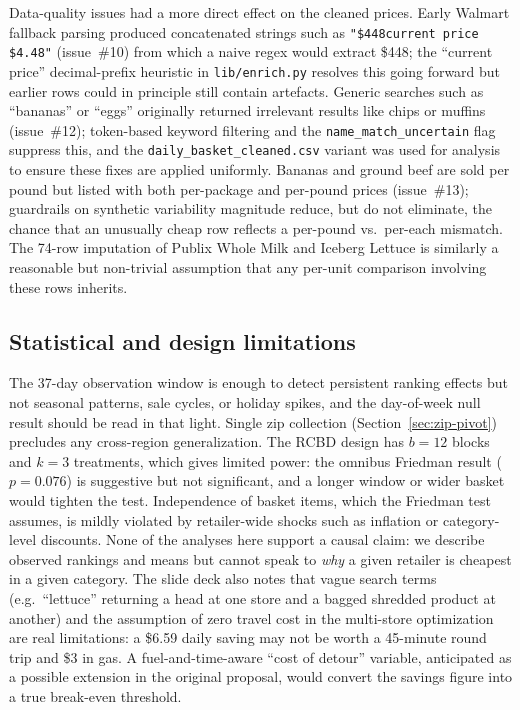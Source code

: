 \documentclass[11pt]{article}
\begin{document}
Data-quality issues had a more direct effect on the cleaned prices.
Early Walmart fallback parsing produced concatenated strings such as
\texttt{"\$448current price \$4.48"} (issue~\#10) from which a naive
regex would extract \$448; the ``current price'' decimal-prefix
heuristic in \texttt{lib/enrich.py} resolves this going forward but
earlier rows could in principle still contain artefacts. Generic
searches such as ``bananas'' or ``eggs'' originally returned
irrelevant results like chips or muffins (issue~\#12); token-based
keyword filtering and the \texttt{name\_match\_uncertain} flag
suppress this, and the \texttt{daily\_basket\_cleaned.csv} variant
was used for analysis to ensure these fixes are applied uniformly.
Bananas and ground beef are sold per pound but listed with both
per-package and per-pound prices (issue~\#13); guardrails on
synthetic variability magnitude reduce, but do not eliminate, the
chance that an unusually cheap row reflects a per-pound vs.\ per-each
mismatch. The 74-row imputation of Publix Whole Milk and Iceberg
Lettuce is similarly a reasonable but non-trivial assumption that any
per-unit comparison involving these rows inherits.

\subsection{Statistical and design limitations}

The 37-day observation window is enough to detect persistent ranking
effects but not seasonal patterns, sale cycles, or holiday spikes,
and the day-of-week null result should be read in that light. Single
zip collection (Section~\ref{sec:zip-pivot}) precludes any
cross-region generalization. The RCBD design has $b = 12$ blocks and
$k = 3$ treatments, which gives limited power: the omnibus Friedman
result ($p = 0.076$) is suggestive but not significant, and a longer
window or wider basket would tighten the test. Independence of
basket items, which the Friedman test assumes, is mildly violated by
retailer-wide shocks such as inflation or category-level discounts.
None of the analyses here support a causal claim: we describe
observed rankings and means but cannot speak to \textit{why} a given
retailer is cheapest in a given category. The slide deck also notes
that vague search terms (e.g.\ ``lettuce'' returning a head at one
store and a bagged shredded product at another) and the assumption of
zero travel cost in the multi-store optimization are real
limitations: a \$6.59 daily saving may not be worth a 45-minute round
trip and \$3 in gas. A fuel-and-time-aware ``cost of detour''
variable, anticipated as a possible extension in the original
proposal, would convert the savings figure into a true break-even
threshold.
\end{document}
